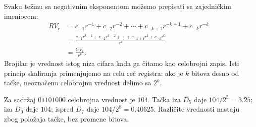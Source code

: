 
Svaku težinu sa negativnim eksponentom možemo prepisati sa zajedničkim imeniocem:
\[\begin{aligned}
RV_r&=c_{-1}r^{-1}+c_{-2}r^{-2}+\cdots+c_{-k+1}r^{-k+1}+c_{-k}r^{-k}\\
&=\frac{c_{-1}r^{k-1}+c_{-2}r^{k-2}+\cdots+c_{-k+1}r^1+c_{-k}r^0}{r^k}\\
&=\frac{CV_r}{r^k}.
\end{aligned}\]
Brojilac je vrednost istog niza cifara kada ga čitamo kao celobrojni zapis. Isti princip skaliranja primenjujemo na celu reč registra: ako je $k$ bitova desno od tačke, neoznačenu celobrojnu vrednost delimo sa $2^k$.

Za sadržaj $01101000$ celobrojna vrednost je $104$. Tačka iza $D_5$ daje $104/2^5=3.25$; iza $D_0$ daje $104$; ispred $D_7$ daje $104/2^8=0.40625$. Različite vrednosti nastaju zbog položaja tačke, bez promene bitova.
